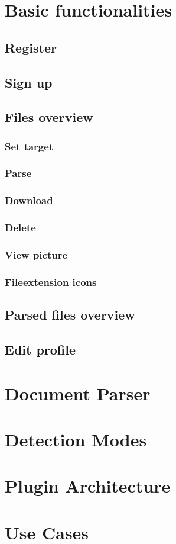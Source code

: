 \section{Basic functionalities}
\subsection{Register}
\subsection{Sign up}
\subsection{Files overview}
\subsubsection{Set target}
\subsubsection{Parse}
\subsubsection{Download}
\subsubsection{Delete}
\subsubsection{View picture}
\subsubsection{Fileextension icons}
\subsection{Parsed files overview}
\subsection{Edit profile}

\section{Document Parser}

\section{Detection Modes}

\section{Plugin Architecture}

\section{Use Cases}
